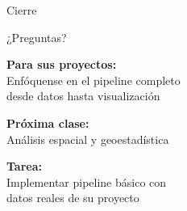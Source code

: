 \documentclass[10pt,aspectratio=169]{beamer}
\begin{document}
\begin{frame}{Cierre}
    \begin{center}
        \Large{¿Preguntas?}
        
        \vspace{1cm}
        
        \textbf{Para sus proyectos:}\\
        Enfóquense en el pipeline completo\\
        desde datos hasta visualización
        
        \vspace{1cm}
        
        \textbf{Próxima clase:}\\
        Análisis espacial y geoestadística
        
        \vspace{0.5cm}
        
        \textbf{Tarea:}\\
        Implementar pipeline básico con\\
        datos reales de su proyecto
    \end{center}
\end{frame}
\end{document}
